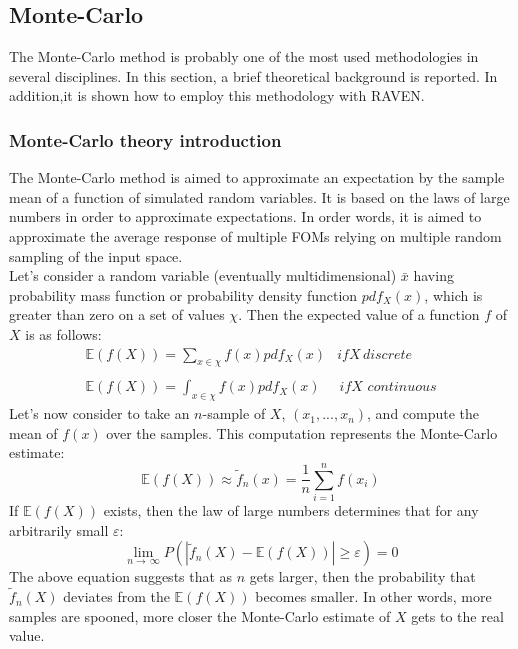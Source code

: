 \subsection{Monte-Carlo}
\label{sub:MC}
The Monte-Carlo method is probably one of the most used methodologies in several disciplines. In this section, a brief theoretical 
background is reported. In addition,it is shown how to employ this methodology with RAVEN.
\subsubsection{Monte-Carlo theory introduction}
\label{subsub:MCtheory}
The Monte-Carlo method is aimed to approximate an expectation by the sample mean of a function of 
simulated random variables. It is based on the laws of large numbers in order to approximate expectations. 
In order words, it is aimed to approximate the average response of multiple FOMs 
relying on multiple random sampling of the input space. 
\\Let's consider a random variable (eventually multidimensional) $\bar{x}$ having probability mass function or probability density function $pdf_{X}(x)$,
which is greater than zero on a set of values $\chi$. Then the expected value of a function $f$ of $X$ is as follows:
\begin{equation}
\begin{matrix}
\mathbb{E}(f(X)) =\sum_{x \in \chi} f(x)pdf_{X}(x) & if X \, discrete \\ 
\\ 
\mathbb{E}(f(X)) =\int_{x \in \chi} f(x)pdf_{X}(x) & \, if X \, \, continuous
\end{matrix}
\end{equation}
Let's now consider to take an $n$-sample of $X$, $(x_{1},...,x_{n})$, and compute the mean of $f(x)$ over the samples. This computation represents the Monte-Carlo estimate:
\begin{equation}
  \mathbb{E}(f(X)) \approx   \widetilde{f}_{n}(x) = \frac{1}{n} \sum_{i=1}^{n} f(x_{i})  
\end{equation}
If $\mathbb{E}(f(X))$ exists, then the law of large numbers determines that for any arbitrarily small $\varepsilon$:
\begin{equation}
  \lim_{n\rightarrow \, \infty} P( \left | \widetilde{f}_{n}(X) - \mathbb{E}(f(X))  \right |\geq \varepsilon) = 0
\end{equation}
The above equation suggests that as $n$ gets larger, then the probability that $\widetilde{f}_{n}(X)$ deviates 
from the $\mathbb{E}(f(X))$ becomes smaller. In other words, more samples are spooned, more closer the Monte-Carlo estimate of $X$ gets to the real value.
